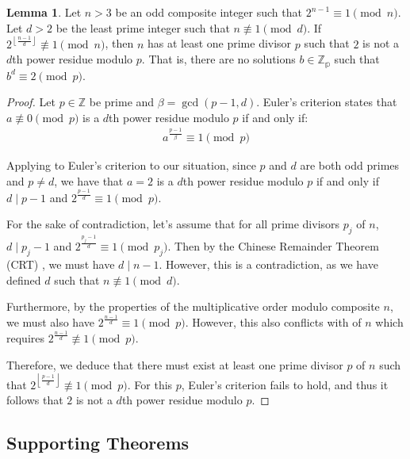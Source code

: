 \documentclass{article}
\theoremstyle{plain}
\theoremstyle{definition}
\newtheorem{lemma}{Lemma}
\newcommand{\floor}[1]{\left\lfloor #1 \right\rfloor}
\begin{document}
\begin{lemma} \label{lemma:nonresidue}
Let $n>3$ be an odd composite integer such that $2^{n-1} \equiv 1 \pmod{n}$. Let $d > 2$ be the least prime integer such that $n \not\equiv 1 \pmod{d}$. If $2^{\floor{\frac{n-1}{d}}} \not\equiv 1 \pmod{n}$, then $n$ has at least one prime divisor $p$ such that $2$ is not a $d$th power residue modulo $p$. That is, there are no solutions $b \in \mathbb{Z_p}$ such that $b^d \equiv 2 \pmod{p}$.
\end{lemma}
\begin{proof}
Let $p \in \mathbb{Z}$ be prime and $\beta = \gcd(p-1, d)$. Euler's criterion \cite{euler1914powerresidues} states that $a \not\equiv 0 \pmod p$ is a $d$th power residue modulo $p$ if and only if:
\begin{align}
a^{\frac{p-1}{\beta}} \equiv 1 \pmod p
\end{align}

Applying to Euler's criterion to our situation, since $p$ and $d$ are both odd primes and $p \not= d$, we have that $a=2$ is a $d$th power residue modulo $p$ if and only if $d \mid p-1$ and $2^{\frac{p-1}{d}} \equiv 1 \pmod p$.

For the sake of contradiction, let's assume that for all prime divisors $p_j$ of $n$, $d \mid p_j-1$ and $2^{\frac{p_j-1}{d}} \equiv 1 \pmod p_j$. Then by the Chinese Remainder Theorem (CRT) \cite{cormen2009algorithms}, we must have $d \mid n-1$. However, this is a contradiction, as we have defined $d$ such that $n \not\equiv 1 \pmod{d}$.

Furthermore, by the properties of the multiplicative order modulo composite $n$, we must also have $2^{\frac{n-1}{d}} \equiv 1 \pmod p$. However, this also conflicts with of $n$ which requires $2^{\frac{n-1}{d}} \not\equiv 1 \pmod p$.

Therefore, we deduce that there must exist at least one prime divisor $p$ of $n$ such that $2^{\floor{\frac{p-1}{d}}} \not\equiv 1 \pmod{p}$. For this $p$, Euler's criterion fails to hold, and thus it follows that $2$ is not a $d$th power residue modulo $p$.
\end{proof}

\subsection{Supporting Theorems}
\end{document}
